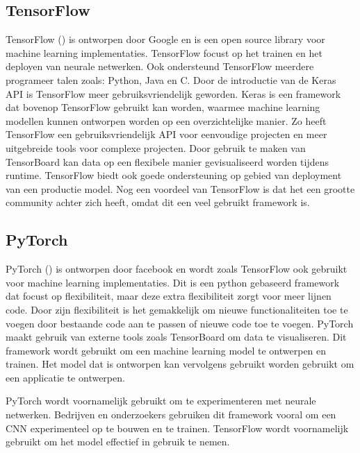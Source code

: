 \subsection{TensorFlow}
TensorFlow (\cite{abadi_tensorflow_2016}) is ontworpen door Google en is een open source library voor machine learning implementaties.
TensorFlow focust op het trainen en het deployen van neurale netwerken.
Ook ondersteund TensorFlow meerdere programeer talen zoals: Python, Java en C.
Door de introductie van de Keras API is TensorFlow meer gebruiksvriendelijk geworden.
Keras is een framework dat bovenop TensorFlow gebruikt kan worden, waarmee machine learning modellen kunnen ontworpen worden op een overzichtelijke manier.
Zo heeft TensorFlow een gebruiksvriendelijk API voor eenvoudige projecten en meer uitgebreide tools voor complexe projecten.
Door gebruik te maken van TensorBoard kan data op een flexibele manier gevisualiseerd worden tijdens runtime. 
TensorFlow biedt ook goede ondersteuning op gebied van deployment van een productie model.
Nog een voordeel van TensorFlow is dat het een grootte community achter zich heeft, omdat dit een veel gebruikt framework is.

\subsection{PyTorch}
PyTorch (\cite{li_PyTorch_2020}) is ontworpen door facebook en wordt zoals TensorFlow ook gebruikt voor machine learning implementaties.
Dit is een python gebaseerd framework dat focust op flexibiliteit, maar deze extra flexibiliteit zorgt voor meer lijnen code.
Door zijn flexibiliteit is het gemakkelijk om nieuwe functionaliteiten toe te voegen door bestaande code aan te passen of nieuwe code toe te voegen.
PyTorch maakt gebruik van externe tools zoals TensorBoard om data te visualiseren.
Dit framework wordt gebruikt om een machine learning model te ontwerpen en trainen.
Het model dat is ontworpen kan vervolgens gebruikt worden gebruikt om een applicatie te ontwerpen.

PyTorch wordt voornamelijk gebruikt om te experimenteren met neurale netwerken.
Bedrijven en onderzoekers gebruiken dit framework vooral om een CNN experimenteel op te bouwen en te trainen.
TensorFlow wordt voornamelijk gebruikt om het model effectief in gebruik te nemen.

